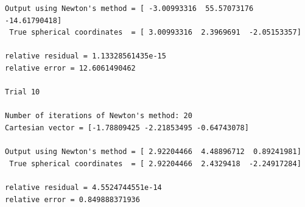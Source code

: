 \documentclass[10pt]{article}
\begin{document}
\begin{enumerate}
\begin{verbatim}
Output using Newton's method = [ -3.00993316  55.57073176 -14.61790418]
 True spherical coordinates  = [ 3.00993316  2.3969691  -2.05153357]

relative residual = 1.13328561435e-15
relative error = 12.6061490462

Trial 10

Number of iterations of Newton's method: 20
Cartesian vector = [-1.78809425 -2.21853495 -0.64743078]

Output using Newton's method = [ 2.92204466  4.48896712  0.89241981]
 True spherical coordinates  = [ 2.92204466  2.4329418  -2.24917284]

relative residual = 4.5524744551e-14
relative error = 0.849888371936
\end{verbatim}

\end{enumerate}
\end{document}

